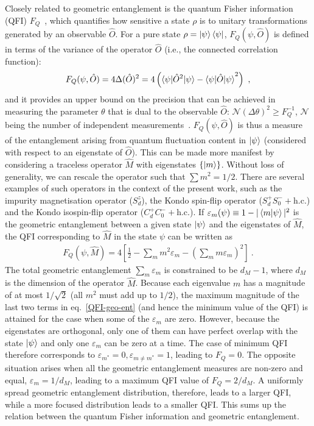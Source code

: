 \documentclass{iopart}
\begin{document}
Closely related to geometric entanglement is the quantum Fisher information (QFI) \(F_Q\)~\cite{braunstein1994statistical,Hauke2016}, which quantifies how sensitive a state \(\rho\) is to unitary transformations generated by an observable \(\hat O\).
For a pure state \(\rho = \ket{\psi}\bra{\psi}\), \(F_Q (\psi,\hat O)\) is defined in terms of the variance of the operator $\hat O$ (i.e., the connected correlation function):
\begin{eqnarray}
	F_Q(\psi,\hat O) = 4 \Delta (\hat O)^{2}= 4\left(\braket{\psi|\hat O^2|\psi} - \braket{\psi|\hat O|\psi}^2\right)~,
\end{eqnarray}
and it provides an upper bound on the precision that can be achieved in measuring the parameter \(\theta\) that is dual to the observable \(\hat O\): \(\mathcal{N}\left( \Delta \theta \right)^2 \geq F_Q^{-1} \), \(\mathcal{N}\) being the number of independent measurements~\cite{braunstein1994statistical,Hauke2016}. \(F_Q (\psi,\hat O)\) is thus a measure of the entanglement arising from quantum fluctuation content in $\ket{\psi}$ (considered with respect to an eigenstate of $\hat O$). This can be made more manifest by considering a traceless operator \(\hat M\) with eigenstates \(\left\{\ket{m}\right\}\). Without loss of generality, we can rescale the operator such that \(\sum m^2 = 1/2\). There are several examples of such operators in the context of the present work, such as the impurity magnetisation operator (\(S_d^z\)), the Kondo spin-flip operator (\(S_d^+ S_0^- + \text{h.c.}\)) and the Kondo isospin-flip operator (\(C_d^+ C_0^- + \text{h.c.}\)). If \(\varepsilon_m(\psi) \equiv 1 - |\braket{m | \psi}|^2\) is the geometric entanglement between a given state \(\ket{\psi}\) and the eigenstates of \(\hat M\), the QFI corresponding to \(\hat M\) in the state \(\psi\) can be written as
\begin{eqnarray}\label{QFI-geo-ent}
	F_Q(\psi,\hat M) = 4\left[\frac{1}{2} - \sum_m m^2\varepsilon_m - \left(\sum_m m\varepsilon_m\right)^2 \right] ~.
\end{eqnarray}
The total geometric entanglement \(\sum_m \varepsilon_m\) is constrained to be \(d_M - 1\), where \(d_M\) is the dimension of the operator \(\hat M\).
Because each eigenvalue \(m\) has a magnitude of at most \(1/\sqrt 2\) (all \(m^2\) must add up to \(1/2\)), the maximum magnitude of the last two terms in eq.~\eqref{QFI-geo-ent} (and hence the minimum value of the QFI) is attained for the case when some of the \(\varepsilon_m\) are zero.
However, because the eigenstates are orthogonal, only one of them can have perfect overlap with the state \(\ket{\psi}\) and only one \(\varepsilon_m\) can be zero at a time.
The case of minimum QFI therefore corresponds to \(\varepsilon_{m^*} = 0, \varepsilon_{m\neq m^*}=1\), leading to \(F_Q = 0\).
The opposite situation arises when all the geometric entanglement measures are non-zero and equal, \(\varepsilon_m = 1/d_M\), leading to a maximum QFI value of \(F_Q = 2/d_M\).
A uniformly spread geometric entanglement distribution, therefore, leads to a larger QFI, while a more focused distribution leads to a smaller QFI.
This sums up the relation between the quantum Fisher information and geometric entanglement.
\end{document}
